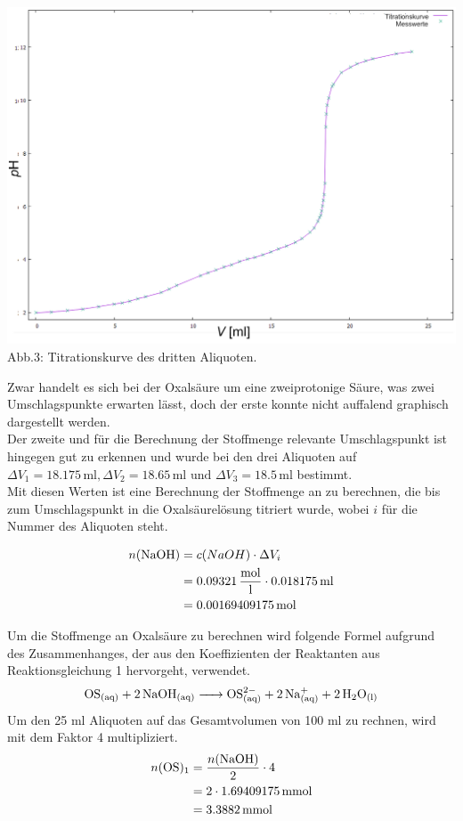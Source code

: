 \documentclass[12pt]{scrartcl} %
\begin{document}
\begin{center}
    \includegraphics[width=\textwidth]{Abb/oleg3.png}\\
    Abb.3: Titrationskurve des dritten Aliquoten.
\end{center}

Zwar handelt es sich bei der Oxalsäure um eine zweiprotonige Säure, was zwei Umschlagspunkte erwarten lässt, doch der erste konnte nicht auffalend graphisch dargestellt werden.\\
Der zweite und für die Berechnung der Stoffmenge relevante Umschlagspunkt ist hingegen gut zu erkennen und wurde bei den drei Aliquoten auf \\$\Delta V_1 = 18.175\,\mathrm{ml}, \Delta V_2 = 18.65\,\mathrm{ml} \text{ und } \Delta V_3 = 18.5\,\mathrm{ml}$ bestimmt.\\
Mit diesen Werten ist eine Berechnung der Stoffmenge an  zu berechnen, die bis zum Umschlagspunkt in die Oxalsäurelösung titriert wurde, wobei $i$ für die Nummer des Aliquoten steht.

\begin{align*}
    n(\ce{NaOH}) &= c(NaOH) \cdot \Delta V_i\\
    &= 0.09321\,\mathrm{\frac{mol}{l}} \cdot 0.018175\,\mathrm{ml}\\
    &= 0.00169409175\,\mathrm{mol}
\end{align*}

Um die Stoffmenge an Oxalsäure zu berechnen wird folgende Formel aufgrund des Zusammenhanges, der aus den Koeffizienten der Reaktanten aus Reaktionsgleichung 1 hervorgeht, verwendet.
\begin{equation}
    \ce{OS_{(aq)} + 2 NaOH_{(aq)} -> OS^{2-}_{(aq)} + 2 Na^{+}_{(aq)} + 2 H2O_{(l)}} 
\end{equation} 
Um den 25 ml Aliquoten auf das Gesamtvolumen von 100 ml zu rechnen, wird mit dem Faktor 4 multipliziert.
\begin{align*}
    n(\mathrm{OS})_1 &= \frac{n(\ce{NaOH})}{2} \cdot 4\\
    &= 2\cdot 1.69409175\,\mathrm{mmol}\\
    &= 3.3882\,\mathrm{mmol}
\end{align*}
\end{document}
